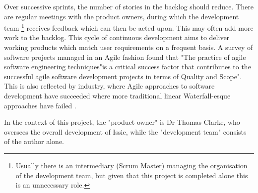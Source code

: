 Over successive sprints, the number of stories in the backlog should reduce. There are regular meetings with the product owners, during which the development team \footnote{Usually there is an intermediary (Scrum Master) managing the organisation of the development team, but given that this project is completed alone this is an unnecessary role.} receives feedback which can then be acted upon. This may often add more work to the backlog. This cycle of continuous development aims to deliver working products which match user requirements on a frequent basis.
A survey \cite{CHOW2008961} of software projects managed in an Agile fashion found that "The practice of agile software engineering techniques"is a critical success factor that contributes to the successful agile software development projects in terms of Quality and Scope". This is also reflected by industry, where Agile approaches to software development have succeeded where more traditional linear Waterfall-esque approaches have failed \cite{mepCW}.

In the context of this project, the "product owner" is Dr Thomas Clarke, who oversees the overall development of Issie, while the "development team" consists of the author alone.
